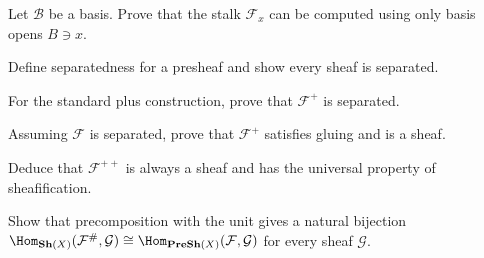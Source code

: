 \begin{exercise}
Let $\mathcal B$ be a basis. Prove that the stalk $\mathcal F_x$ can be computed using only basis opens $B\ni x$.
\end{exercise}

\begin{exercise}
Define separatedness for a presheaf and show every sheaf is separated.
\end{exercise}

\begin{exercise}
For the standard plus construction, prove that $\mathcal F^+$ is separated.
\end{exercise}

\begin{exercise}
Assuming $\mathcal F$ is separated, prove that $\mathcal F^+$ satisfies gluing and is a sheaf.
\end{exercise}

\begin{exercise}
Deduce that $\mathcal F^{++}$ is always a sheaf and has the universal property of sheafification.
\end{exercise}

\begin{exercise}[Adjunction]
Show that precomposition with the unit gives a natural bijection $\Hom_{\Sh(X)}(\mathcal F^\#,\mathcal G)\cong\Hom_{\PreSh(X)}(\mathcal F,\mathcal G)$ for every sheaf $\mathcal G$.
\end{exercise}

